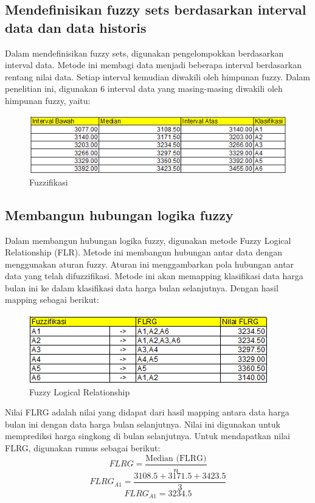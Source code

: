\documentclass[conference]{IEEEtran}
\begin{document}
\subsection{Mendefinisikan fuzzy sets berdasarkan interval data dan data historis}
Dalam mendefinisikan fuzzy sets, digunakan pengelompokkan berdasarkan interval data. Metode ini membagi data menjadi beberapa interval berdasarkan rentang nilai data. Setiap interval kemudian diwakili oleh himpunan fuzzy. Dalam penelitian ini, digunakan 6 interval data yang masing-masing diwakili oleh himpunan fuzzy, yaitu:
\begin{figure}[H]
    \centering
    \includegraphics[scale=0.7]{images/Fuzzifikasi.png} 
    \caption{Fuzzifikasi}
\end{figure}

\subsection{Membangun hubungan logika fuzzy}
Dalam membangun hubungan logika fuzzy, digunakan metode Fuzzy Logical Relationship (FLR). Metode ini membangun hubungan antar data dengan menggunakan aturan fuzzy. Aturan ini menggambarkan pola hubungan antar data yang telah difuzzifikasi. Metode ini akan memapping klasifikasi data harga bulan ini ke dalam klasifikasi data harga bulan selanjutnya. Dengan hasil mapping sebagai berikut:
\begin{figure}[H]
    \centering
    \includegraphics[scale=0.7]{images/FLR.png} 
    \caption{Fuzzy Logical Relationship}
\end{figure}
Nilai FLRG adalah nilai yang didapat dari hasil mapping antara data harga bulan ini dengan data harga bulan selanjutnya. Nilai ini digunakan untuk memprediksi harga singkong di bulan selanjutnya.
Untuk mendapatkan nilai FLRG, digunakan rumus sebagai berikut:
    \begin{equation}
        FLRG = \frac{\text{Median (FLRG)}}{n}
    \end{equation}
    \begin{equation*}
        FLRG_{A1} = \frac{3108.5 + 3171.5 + 3423.5}{3}
    \end{equation*}
    \begin{equation*}
        FLRG_{A1} = 3234.5
    \end{equation*}
   
\end{document}
